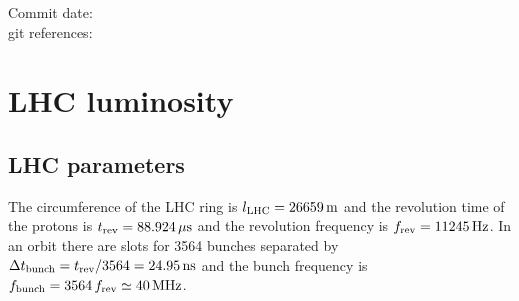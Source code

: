\documentclass[10pt]{article}
\begin{document}
Commit date: \gitCommitterIsoDate\\
git references: \gitReferences
\section{LHC luminosity}
%
\subsection{LHC parameters}
The circumference of the LHC ring is $l_{\rm LHC}=26659\,{\rm m}$ and the revolution time of the protons is $t_{\rm rev}=88.924\,\mu{\rm s}$ and the revolution frequency is $f_{\rm rev}=11245\,{\rm Hz}$. In an orbit there are slots for 3564 bunches separated by $\Delta t_{\rm bunch} = t_{\rm rev}/3564 = 24.95\,{\rm ns}$ and the bunch frequency is $f_{\rm bunch} = 3564\,f_{\rm rev} \simeq 40\,{\rm MHz}$.
%
\end{document}
